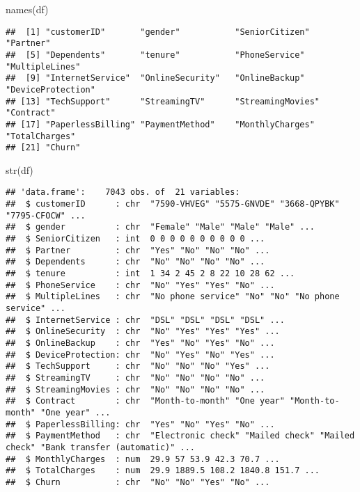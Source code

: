 \documentclass[
]{article}
\newenvironment{Shaded}{\begin{snugshade}}{\end{snugshade}}
\newcommand{\FunctionTok}[1]{\textcolor[rgb]{0.00,0.00,0.00}{#1}}
\newcommand{\NormalTok}[1]{#1}
\begin{document}
\begin{Shaded}
\begin{Highlighting}[]
\FunctionTok{names}\NormalTok{(df)}
\end{Highlighting}
\end{Shaded}

\begin{verbatim}
##  [1] "customerID"       "gender"           "SeniorCitizen"    "Partner"         
##  [5] "Dependents"       "tenure"           "PhoneService"     "MultipleLines"   
##  [9] "InternetService"  "OnlineSecurity"   "OnlineBackup"     "DeviceProtection"
## [13] "TechSupport"      "StreamingTV"      "StreamingMovies"  "Contract"        
## [17] "PaperlessBilling" "PaymentMethod"    "MonthlyCharges"   "TotalCharges"    
## [21] "Churn"
\end{verbatim}

\begin{Shaded}
\begin{Highlighting}[]
\FunctionTok{str}\NormalTok{(df)}
\end{Highlighting}
\end{Shaded}

\begin{verbatim}
## 'data.frame':    7043 obs. of  21 variables:
##  $ customerID      : chr  "7590-VHVEG" "5575-GNVDE" "3668-QPYBK" "7795-CFOCW" ...
##  $ gender          : chr  "Female" "Male" "Male" "Male" ...
##  $ SeniorCitizen   : int  0 0 0 0 0 0 0 0 0 0 ...
##  $ Partner         : chr  "Yes" "No" "No" "No" ...
##  $ Dependents      : chr  "No" "No" "No" "No" ...
##  $ tenure          : int  1 34 2 45 2 8 22 10 28 62 ...
##  $ PhoneService    : chr  "No" "Yes" "Yes" "No" ...
##  $ MultipleLines   : chr  "No phone service" "No" "No" "No phone service" ...
##  $ InternetService : chr  "DSL" "DSL" "DSL" "DSL" ...
##  $ OnlineSecurity  : chr  "No" "Yes" "Yes" "Yes" ...
##  $ OnlineBackup    : chr  "Yes" "No" "Yes" "No" ...
##  $ DeviceProtection: chr  "No" "Yes" "No" "Yes" ...
##  $ TechSupport     : chr  "No" "No" "No" "Yes" ...
##  $ StreamingTV     : chr  "No" "No" "No" "No" ...
##  $ StreamingMovies : chr  "No" "No" "No" "No" ...
##  $ Contract        : chr  "Month-to-month" "One year" "Month-to-month" "One year" ...
##  $ PaperlessBilling: chr  "Yes" "No" "Yes" "No" ...
##  $ PaymentMethod   : chr  "Electronic check" "Mailed check" "Mailed check" "Bank transfer (automatic)" ...
##  $ MonthlyCharges  : num  29.9 57 53.9 42.3 70.7 ...
##  $ TotalCharges    : num  29.9 1889.5 108.2 1840.8 151.7 ...
##  $ Churn           : chr  "No" "No" "Yes" "No" ...
\end{verbatim}
\end{document}
